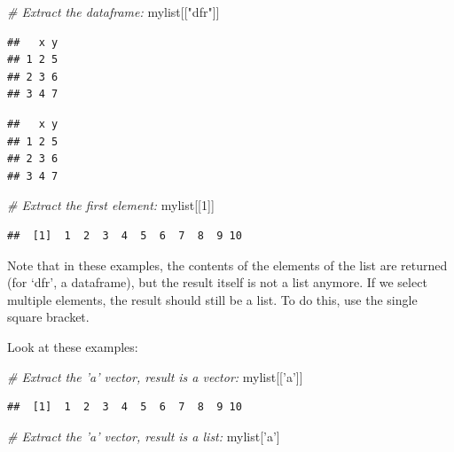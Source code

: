 \documentclass[]{book}
\newenvironment{Shaded}{\begin{snugshade}}{\end{snugshade}}
\newcommand{\CommentTok}[1]{\textcolor[rgb]{0.56,0.35,0.01}{\textit{#1}}}
\newcommand{\DecValTok}[1]{\textcolor[rgb]{0.00,0.00,0.81}{#1}}
\newcommand{\NormalTok}[1]{#1}
\newcommand{\OperatorTok}[1]{\textcolor[rgb]{0.81,0.36,0.00}{\textbf{#1}}}
\newcommand{\StringTok}[1]{\textcolor[rgb]{0.31,0.60,0.02}{#1}}
\begin{document}
\begin{Shaded}
\begin{Highlighting}[]
\CommentTok{# Extract the dataframe:}
\NormalTok{mylist[[}\StringTok{"dfr"}\NormalTok{]]}
\end{Highlighting}
\end{Shaded}

\begin{verbatim}
##   x y
## 1 2 5
## 2 3 6
## 3 4 7
\end{verbatim}

\begin{Shaded}
\end{Shaded}

\begin{verbatim}
##   x y
## 1 2 5
## 2 3 6
## 3 4 7
\end{verbatim}

\begin{Shaded}
\begin{Highlighting}[]
\CommentTok{# Extract the first element:}
\NormalTok{mylist[[}\DecValTok{1}\NormalTok{]]}
\end{Highlighting}
\end{Shaded}

\begin{verbatim}
##  [1]  1  2  3  4  5  6  7  8  9 10
\end{verbatim}

Note that in these examples, the contents of the elements of the list are returned (for `dfr', a dataframe), but the result itself is not a list anymore. If we select multiple elements, the result should still be a list. To do this, use the single square bracket.

Look at these examples:

\begin{Shaded}
\begin{Highlighting}[]
\CommentTok{# Extract the 'a' vector, result is a vector:}
\NormalTok{mylist[[}\StringTok{'a'}\NormalTok{]]}
\end{Highlighting}
\end{Shaded}

\begin{verbatim}
##  [1]  1  2  3  4  5  6  7  8  9 10
\end{verbatim}

\begin{Shaded}
\begin{Highlighting}[]
\CommentTok{# Extract the 'a' vector, result is a list:}
\NormalTok{mylist[}\StringTok{'a'}\NormalTok{]}
\end{Highlighting}
\end{Shaded}
\end{document}
